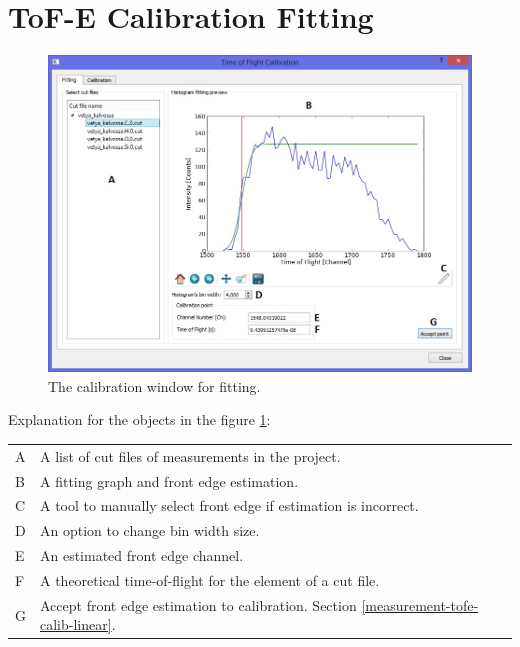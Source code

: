 \documentclass{scrreprt}
\begin{document}
\section{ToF-E Calibration Fitting}\label{measurement-tofe-calib-curve}
\begin{figure}[H]
\centering
\includegraphics[width=140mm]{measurement-tofe-calib-curve}
\caption{The calibration window for fitting.}
\label{fig-tofe-calib-curve}
\end{figure}
Explanation for the objects in the figure \ref{fig-tofe-calib-curve}:

\begin{tabular}{ll}
A & A list of cut files of measurements in the project.\\
B & A fitting graph and front edge estimation.\\
C & A tool to manually select front edge if estimation is incorrect.\\
D & An option to change bin width size.\\
E & An estimated front edge channel.\\
F & A theoretical time-of-flight for the element of a cut file.\\
G & Accept front edge estimation to calibration. Section \ref{measurement-tofe-calib-linear}.\\
\end{tabular}

\end{document}
